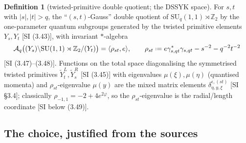 \documentclass[11pt,a4paper]{article}
\providecommand{\coloneqq}{\mathrel{\vcenter{\baselineskip0.5ex \lineskiplimit0pt
      \hbox{\scriptsize.}\hbox{\scriptsize.}}}=}
\theoremstyle{definition}
\newtheorem{definition}{Definition}[section]
\theoremstyle{plain}
\newcommand{\Z}{\mathbb{Z}}
\newcommand{\A}{\mathcal{A}}
\begin{document}
\begin{definition}[twisted-primitive double quotient; the DSSYK space]\label{def:dssykspace}
For $s,t$ with $|s|,|t|>q$, the ``$(s,t)$-Gauss'' double quotient of
$\mathrm{SU}_q(1,1)\rtimes\Z_2$ by the one-parameter quantum subgroups generated by the twisted
primitive elements $Y_{s},Y_{t}$ [SI (3.43)], with invariant $*$-algebra
\begin{equation}\label{eq:invariantalgebra}
  \A_q\bigl((Y_s)\backslash \mathrm{SU}(1,1)\rtimes\Z_2/(Y_t)\bigr)=\langle\rho_{st},e\rangle,
  \qquad
  \rho_{st}\coloneqq e\gamma^{*}_{s,qt}\gamma_{s,qt}-s^{-2}-q^{-2}t^{-2}
\end{equation}
[SI (3.47)--(3.48)]. Functions on the total space diagonalising the symmetrised twisted
primitives $\tilde Y^{L}_{t},\tilde Y^{R}_{s}$ [SI (3.45)] with eigenvalues $\mu(\xi),\mu(\eta)$
(quantised momenta) and $\rho_{st}$-eigenvalue $\mu(y)$ are the mixed matrix elements
$\delta^{\epsilon,(st)}_{\eta,y,\xi}$ [SI \S3.4]; classically $\rho_{-1,1}=-2+4e^{2\varphi}$, so
the $\rho_{st}$-eigenvalue is the radial/length coordinate [SI below (3.49)].
\end{definition}

\subsection{The choice, justified from the sources}
\end{document}
